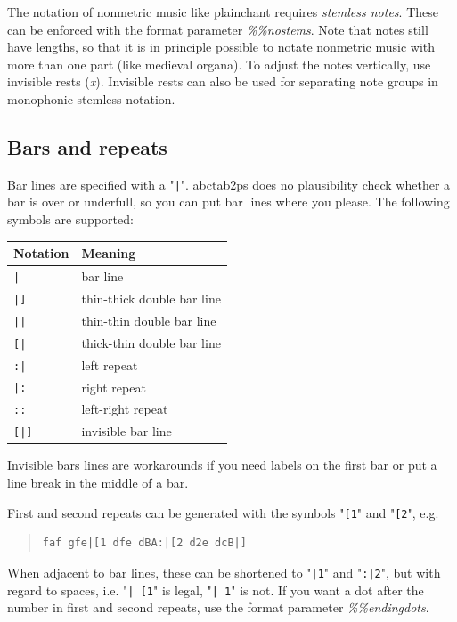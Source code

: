 \documentclass[a4paper]{article}
\begin{document}
 
The notation of nonmetric music like plainchant requires {\it stemless notes}.
These can be enforced with the format parameter {\it \%\%nostems}.
Note that notes still have lengths, so that it is in principle possible
to notate nonmetric music with more than one part (like medieval organa).
To adjust the notes vertically, use invisible rests ({\it x}). Invisible
rests can also be used for separating note groups in monophonic stemless
notation.

\subsection{Bars and repeats}
  
Bar lines are specified with a "\verb$|$". abctab2ps does no 
plausibility check whether a bar is over or underfull, so you can 
put bar lines where you please. The following symbols are supported:

\begin{center}
\begin{tabular}{|l|l|} \hline
Notation & Meaning \\ \hline
 \verb$|$ & bar line \\ \hline
 \verb$|]$ & thin-thick double bar line \\ \hline
 \verb$||$ & thin-thin double bar line \\ \hline
 \verb$[|$ & thick-thin double bar line \\ \hline
 \verb$:|$ & left repeat \\ \hline
 \verb$|:$ & right repeat \\ \hline
 \verb$::$ & left-right repeat \\ \hline
 \verb$[|]$ & invisible bar line \\ \hline
\end{tabular}
\end{center}

Invisible bars lines are workarounds if you need labels on the
first bar or put a line break in the middle of a bar.

First and second repeats can be generated with the symbols "\verb$[1$" 
and "\verb$[2$",  e.g.
\begin{quote}
\begin{verbatim}
faf gfe|[1 dfe dBA:|[2 d2e dcB|]
\end{verbatim}
\end{quote}
When adjacent to bar lines, these can be shortened to 
"\verb$|1$" and "\verb$:|2$", but with  regard  to
spaces, i.e. "\verb$| [1$" is legal, "\verb$| 1$" is not.
If you want a dot after the number in first and second repeats, use
the format parameter {\it \%\%endingdots}.
\end{document}
